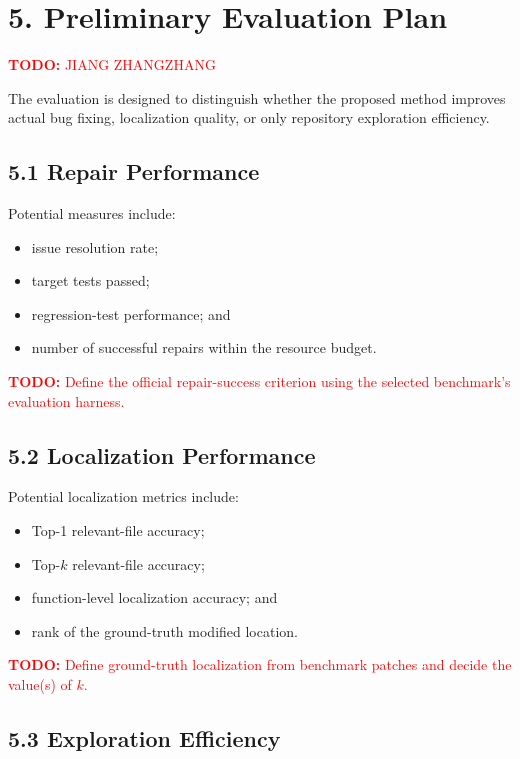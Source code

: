 \documentclass[11pt]{article}
\newcommand{\todo}[1]{%
    \textcolor{red}{\textbf{TODO:} #1}%
}
\begin{document}
\section*{5. Preliminary Evaluation Plan}

\todo{JIANG ZHANGZHANG}

The evaluation is designed to distinguish whether the proposed method
improves actual bug fixing, localization quality, or only repository
exploration efficiency.

\subsection*{5.1 Repair Performance}

Potential measures include:

\begin{itemize}[leftmargin=*, itemsep=0.25em]
    \item issue resolution rate;
    \item target tests passed;
    \item regression-test performance; and
    \item number of successful repairs within the resource budget.
\end{itemize}

\todo{Define the official repair-success criterion using the selected
benchmark's evaluation harness.}


\subsection*{5.2 Localization Performance}

Potential localization metrics include:

\begin{itemize}[leftmargin=*, itemsep=0.25em]
    \item Top-1 relevant-file accuracy;
    \item Top-$k$ relevant-file accuracy;
    \item function-level localization accuracy; and
    \item rank of the ground-truth modified location.
\end{itemize}

\todo{Define ground-truth localization from benchmark patches and decide
the value(s) of $k$.}


\subsection*{5.3 Exploration Efficiency}
\end{document}
